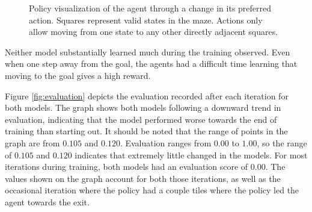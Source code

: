 \documentclass[12pt]{article}
\begin{document}
\begin{figure}[h]
	\begin{center}
		\begin{subfigure}{0.4\linewidth}
			
			\label{fig:policy_350}
		\end{subfigure}
		\hspace{0.1in}
		\begin{subfigure}{0.4\linewidth}
			
			\label{fig:policy_400}
		\end{subfigure}
	\end{center}
	\begin{center}
		\begin{subfigure}{0.4\linewidth}
			
			\label{fig:policy_450}
		\end{subfigure}
		\hspace{0.1in}
		\begin{subfigure}{0.4\linewidth}
			
			\label{fig:policy_500}
		\end{subfigure}
	\end{center}
	\caption{Policy visualization of the agent through a change in its preferred action. Squares represent valid states in the maze. Actions only allow moving from one state to any other directly adjacent squares.}
	\label{fig:policy}
\end{figure}

Neither model substantially learned much during the training observed.
Even when one step away from the goal, the agents had a difficult time learning that moving to the goal gives a high reward.

Figure \ref{fig:evaluation} depicts the evaluation recorded after each iteration for both models.
The graph shows both models following a downward trend in evaluation, indicating that the model performed worse towards the end of training than starting out.
It should be noted that the range of points in the graph are from $0.105$ and $0.120$.
Evaluation ranges from $0.00$ to $1.00$, so the range of $0.105$ and $0.120$ indicates that extremely little changed in the models.
For most iterations during training, both models had an evaluation score of $0.00$.
The values shown on the graph account for both those iterations, as well as the occasional iteration where the policy had a couple tiles where the policy led the agent towards the exit.
\end{document}
